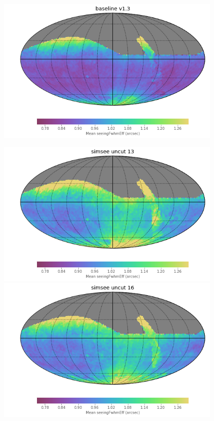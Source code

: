 \documentclass[\docopts]{\docclass}
\begin{document}
\begin{figure}
\begin{center}
  \includegraphics[width=\columnwidth]{seeing_map_baseline_v1_3_10yrs.png}
\endminipage\hfill
\end{center}
  \includegraphics[width=\columnwidth]{seeing_map_ss58777y13_v1_3_10yrs.png}
\endminipage\hfill
{}
  \includegraphics[width=\columnwidth]{seeing_map_ss58777y16_v1_3_10yrs.png}

\end{figure}
\end{document}
